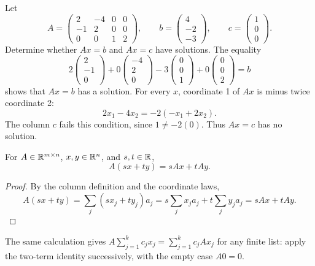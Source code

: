 \begin{example}\label{example:01:representation}
Let
\[
A=\begin{pmatrix}2&-4&0&0\\-1&2&0&0\\0&0&1&2\end{pmatrix},\qquad
b=\begin{pmatrix}4\\-2\\-3\end{pmatrix},\qquad
c=\begin{pmatrix}1\\0\\0\end{pmatrix}.
\]
Determine whether \(Ax=b\) and \(Ax=c\) have solutions.
The equality
\[
2\begin{pmatrix}2\\-1\\0\end{pmatrix}
+0\begin{pmatrix}-4\\2\\0\end{pmatrix}
-3\begin{pmatrix}0\\0\\1\end{pmatrix}
+0\begin{pmatrix}0\\0\\2\end{pmatrix}=b
\]
shows that \(Ax=b\) has a solution.
For every \(x\), coordinate 1 of \(Ax\) is minus twice coordinate 2:
\[
2x_1-4x_2=-2(-x_1+2x_2).
\]
The column \(c\) fails this condition, since \(1\ne-2(0)\).
Thus \(Ax=c\) has no solution.
\end{example}

\begin{proposition}\label{prop:01:linearity}
For \(A\in\mathbb R^{m\times n}\), \(x,y\in\mathbb R^n\), and \(s,t\in\mathbb R\),
\[
A(sx+ty)=sAx+tAy.
\]
\end{proposition}
\begin{proof}
By the column definition and the coordinate laws,
\[
A(sx+ty)=\sum_j(sx_j+ty_j)a_j
=s\sum_jx_ja_j+t\sum_jy_ja_j=sAx+tAy.
\]
\end{proof}
The same calculation gives \(A\sum_{j=1}^k c_jx_j=\sum_{j=1}^k c_jAx_j\)
for any finite list: apply the two-term identity successively, with the
empty case \(A0=0\).

